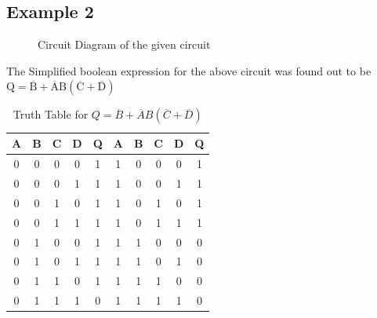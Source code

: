 \documentclass{scrartcl}
\newcommand{\1}{\mathbbm{1}}
\begin{document}
\subsection{Example 2}
\begin{figure}[H]
        \centering
        
        \caption{Circuit Diagram of the given circuit}
\end{figure}
The Simplified boolean expression for the above circuit was found out to be
$\mathrm{Q = \overline{B} + \overline{A}B(\overline{C} + \overline{D})}$
\begin{table}[H]
    \centering
    \caption{Truth Table for $Q = \overline{B} + \overline{A}B(\overline{C} + \overline{D})$ }
    \begin{tabular}{|c|c|c|c||c|||c|c|c|c||c|}
    \hline
        \textbf{A} & \textbf{B} & \textbf{C} & \textbf{D} & \textbf{Q} & \textbf{A} & \textbf{B} & \textbf{C} & \textbf{D} & \textbf{Q}\\ \hline
        0 & 0 & 0 & 0 & 1 & 1 & 0 & 0 & 0 & 1 \\
        0 & 0 & 0 & 1 & 1 & 1 & 0 & 0 & 1 & 1 \\
        0 & 0 & 1 & 0 & 1 & 1 & 0 & 1 & 0 & 1 \\
        0 & 0 & 1 & 1 & 1 & 1 & 0 & 1 & 1 & 1 \\
        0 & 1 & 0 & 0 & 1 & 1 & 1 & 0 & 0 & 0 \\
        0 & 1 & 0 & 1 & 1 & 1 & 1 & 0 & 1 & 0 \\
        0 & 1 & 1 & 0 & 1 & 1 & 1 & 1 & 0 & 0 \\
        0 & 1 & 1 & 1 & 0 & 1 & 1 & 1 & 1 & 0 \\
        \hline
    \end{tabular}
\end{table}
\end{document}
